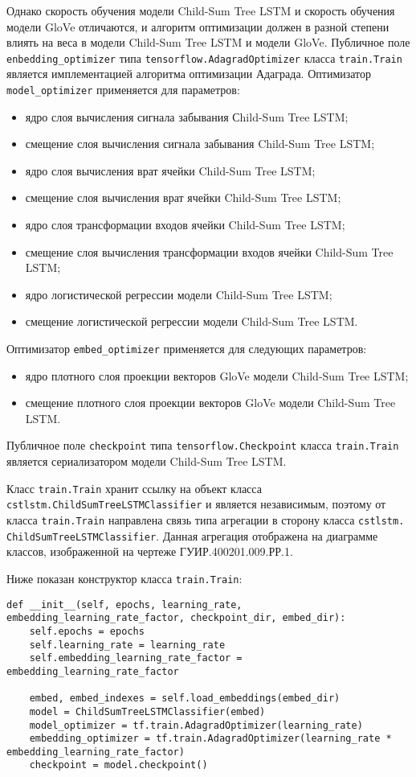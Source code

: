 Однако скорость обучения модели Child-Sum Tree LSTM и скорость обучения модели GloVe отличаются, и алгоритм оптимизации должен в разной степени влиять на веса в модели Child-Sum Tree LSTM и модели GloVe. Публичное поле \texttt{enbedding\_optimizer} типа \texttt{tensorflow.Adagrad\-Optimizer} класса \texttt{train.Train} является имплементацией алгоритма оптимизации Ада\-града. Оптимизатор \texttt{model\_optimizer} применяется для параметров:
\begin{itemize}
\item ядро слоя вычисления сигнала забывания Сhild-Sum Tree LSTM\@;
\item смещение слоя вычисления сигнала забывания Child-Sum Tree LSTM\@;
\item ядро слоя вычисления врат ячейки Child-Sum Tree LSTM\@;
\item смещение слоя вычисления врат ячейки Child-Sum Tree LSTM\@;
\item ядро слоя трансформации входов ячейки Child-Sum Tree LSTM\@;
\item смещение слоя вычисления трансформации входов ячейки Child-Sum Tree LSTM\@;
\item ядро логистической регрессии модели Child-Sum Tree LSTM\@;
\item смещение логистической регрессии модели Child-Sum Tree LSTM\@.
\end{itemize}
Оптимизатор \texttt{embed\_optimizer} применяется для следующих параметров:
\begin{itemize}
\item ядро плотного слоя проекции векторов GloVe модели Child-Sum Tree LSTM\@;
\item смещение плотного слоя проекции векторов GloVe модели Child-Sum Tree LSTM\@.
\end{itemize}

Публичное поле \texttt{checkpoint} типа \texttt{tensorflow.Checkpoint} класса \texttt{tra\-in.Train} является сериализатором модели Child-Sum Tree LSTM\@.

Класс \texttt{train.Train} хранит ссылку на объект класса \texttt{cstlstm.Chi\-ldSum\-TreeLSTMClassifier} и является независимым, поэтому от класса \texttt{train.Tra\-in} направлена связь типа агрегации в сторону класса \texttt{cstlstm.} \texttt{ChildSumTree\-LSTMClassifier}. Данная агрегация отображена на диаграмме классов, изображенной на чертеже ГУИР.400201.009.РР.1.

Ниже показан конструктор класса \texttt{train.Train}:
\medskip
\begin{lstlisting}[style=Python]
  def __init__(self, epochs, learning_rate, embedding_learning_rate_factor, checkpoint_dir, embed_dir):
    self.epochs = epochs
    self.learning_rate = learning_rate
    self.embedding_learning_rate_factor = embedding_learning_rate_factor

    embed, embed_indexes = self.load_embeddings(embed_dir)
    model = ChildSumTreeLSTMClassifier(embed)
    model_optimizer = tf.train.AdagradOptimizer(learning_rate)
    embedding_optimizer = tf.train.AdagradOptimizer(learning_rate * embedding_learning_rate_factor)
    checkpoint = model.checkpoint()
\end{lstlisting}
\medskip


